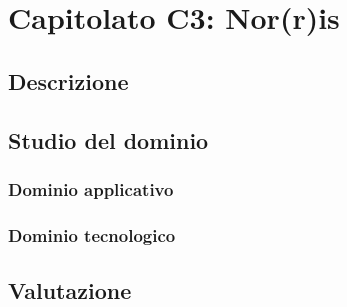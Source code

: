 %


\section{Capitolato C3: Nor(r)is}

\subsection{Descrizione}

\subsection{Studio del dominio}
\subsubsection{Dominio applicativo}
\subsubsection{Dominio tecnologico}

\subsection{Valutazione}